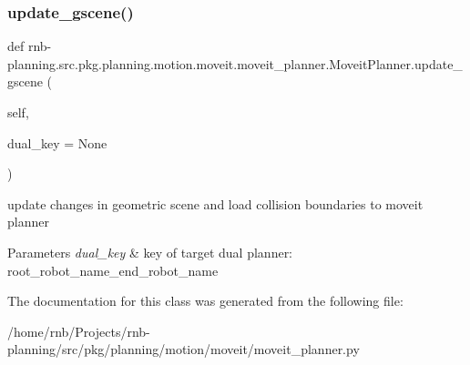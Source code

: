 \subsubsection{\texorpdfstring{update\+\_\+gscene()}{update\_gscene()}}
{\footnotesize\ttfamily def rnb-\/planning.\+src.\+pkg.\+planning.\+motion.\+moveit.\+moveit\+\_\+planner.\+Moveit\+Planner.\+update\+\_\+gscene (\begin{DoxyParamCaption}\item[{}]{self,  }\item[{}]{dual\+\_\+key = {\ttfamily None} }\end{DoxyParamCaption})}



update changes in geometric scene and load collision boundaries to moveit planner 


\begin{DoxyParams}{Parameters}
{\em dual\+\_\+key} & key of target dual planner\+: root\+\_\+robot\+\_\+name\+\_\+end\+\_\+robot\+\_\+name \\
\hline
\end{DoxyParams}


The documentation for this class was generated from the following file\+:\begin{DoxyCompactItemize}
\item 
/home/rnb/\+Projects/rnb-\/planning/src/pkg/planning/motion/moveit/moveit\+\_\+planner.\+py\end{DoxyCompactItemize}
